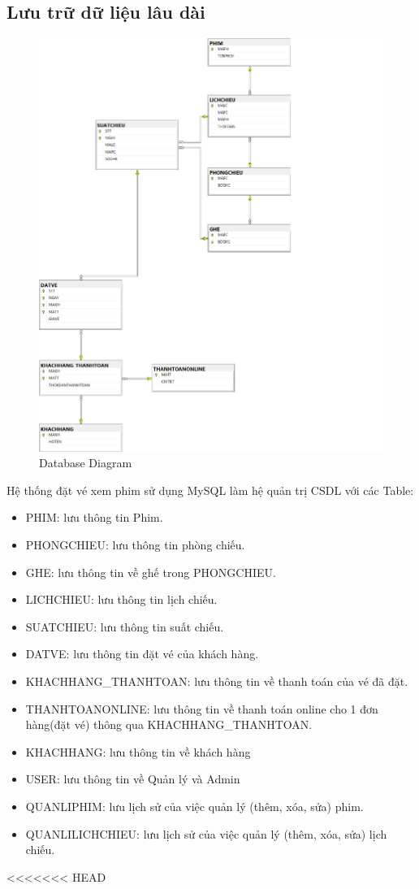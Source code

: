 \documentclass[a4paper, 12pt]{article}
\begin{document}
	\subsection{Lưu trữ dữ liệu lâu dài}
	\begin{figure}[H]
		\begin{center}
			\includegraphics[scale = 0.25]{image/4.4.png}
			\caption{Database Diagram}
		\end{center}
	\end{figure}
	Hệ thống đặt vé xem phim sử dụng MySQL làm hệ quản trị CSDL với các Table:
	\begin{itemize}
		\item PHIM: lưu thông tin Phim.
		\item PHONGCHIEU: lưu thông tin phòng chiếu.
		\item GHE: lưu thông tin về ghế trong PHONGCHIEU.
		\item LICHCHIEU: lưu thông tin lịch chiếu.
		\item SUATCHIEU: lưu thông tin suất chiếu.
		\item DATVE: lưu thông tin đặt vé của khách hàng.
		\item KHACHHANG\_THANHTOAN: lưu thông tin về thanh toán của vé đã đặt.
		\item THANHTOANONLINE: lưu thông tin về thanh toán online cho 1 đơn hàng(đặt vé) thông qua KHACHHANG\_THANHTOAN.
		\item KHACHHANG: lưu thông tin về khách hàng
		\item USER: lưu thông tin về Quản lý và Admin
		\item QUANLIPHIM: lưu lịch sử của việc quản lý (thêm, xóa, sửa) phim.
		\item QUANLILICHCHIEU: lưu lịch sử của việc quản lý (thêm, xóa, sửa) lịch chiếu.
	\end{itemize}	
<<<<<<< HEAD
\end{document}
